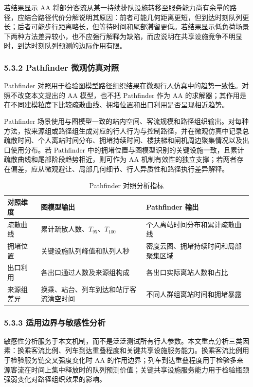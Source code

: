 \documentclass[UTF8,a4paper,12pt]{ctexart}
\begin{document}
若结果显示 AA 将部分客流从某一持续排队设施转移至服务能力尚有余量的路径，应结合路径代价分解说明其原因：前者可能几何距离更短，但到达时刻队列更长；后者可能步行距离略长，但等待时间和尾部滞留更低。若结果显示低负荷场景下两种方法差异较小，也不应强行解释为缺陷，而应说明在共享设施竞争不明显时，到达时刻队列预测的边际作用有限。

\subsubsection{5.3.2 Pathfinder 微观仿真对照}

Pathfinder 对照用于检验图模型路径组织结果在微观行人仿真中的趋势一致性。对照不改变本文提出的 AA 模型，也不把 Pathfinder 作为 AA 的求解器；其作用是在不同建模粒度下比较疏散曲线、拥堵位置和出口利用是否呈现相近趋势。

Pathfinder 场景使用与图模型一致的站内空间、客流规模和路径组织输出。对每种方法，按来源组或路径组生成对应的行人行为与控制路径，并在微观仿真中记录总疏散时间、个人离站时间分布、拥堵持续时间、楼扶梯和闸机周边聚集情况以及出口使用分布。若 Pathfinder 中的拥堵位置与图模型识别的关键设施一致，且累计疏散曲线和尾部阶段趋势相近，则可作为 AA 机制有效性的独立支撑；若两者存在偏差，应从微观避让、局部几何细节、行人异质性和路径执行差异解释。

\begin{table}[htbp]
\centering
\caption{Pathfinder 对照分析指标}
\small
\begin{tabular}{p{}p{}p{}}
\toprule
对照维度 & 图模型输出 & Pathfinder 输出 \\
\midrule
疏散曲线 & 累计疏散人数、\(T_{95}\)、\(T_{100}\) & 个人离站时间分布和累计疏散曲线 \\
拥堵位置 & 关键设施队列峰值和队列人秒 & 密度云图、拥堵持续时间和局部聚集区域 \\
出口利用 & 各出口通过人数及来源组构成 & 各出口实际离站人数和占比 \\
来源组差异 & 换乘、站台、列车到达和站厅客流清空时间 & 不同人群组离站时间和拥堵暴露 \\
\bottomrule
\end{tabular}
\end{table}

\subsubsection{5.3.3 适用边界与敏感性分析}

敏感性分析服务于本文机制，而不是泛泛测试所有行人参数。本文重点分析三类因素：换乘客流比例、列车到达重叠程度和关键共享设施服务能力。换乘客流比例用于检验服务链交叉强度变化时 AA 的作用边界；列车到达重叠程度用于检验多来源客流在时间上集中释放时的队列预测价值；关键共享设施服务能力用于检验瓶颈强弱变化对路径组织效果的影响。
\end{document}
